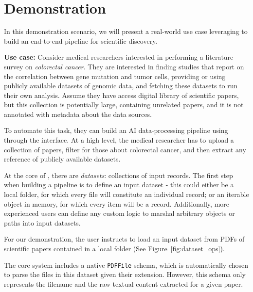 \section{Demonstration}
\label{sec:demoscenario}

In this demonstration scenario, we will present a real-world use case leveraging \chat{} to build an end-to-end pipeline for scientific discovery.

\textbf{Use case:} Consider medical researchers interested in performing a literature survey on \emph{colorectal cancer}. 
They are interested in finding studies that report on the correlation between gene mutation and tumor cells, providing or using publicly available datasets of genomic data, and fetching these datasets to run their own analysis.
Assume they have access digital library of scientific papers, but this collection is potentially large, containing unrelated papers, and it is not annotated with metadata about the data sources.

To automate this task, they can build an AI data-processing pipeline using \sys{} through the \chat{} interface.
At a high level, the medical researcher has to upload a collection of papers, filter for those about colorectal cancer, and then extract any reference of publicly available datasets.

At the core of \sys{}, there are \emph{datasets}: collections of input records.
The first step when building a pipeline is to define an input dataset - this could either be a local folder, for which every file will constitute an individual record; or an iterable object in memory, for which every item will be a record.
Additionally, more experienced users can define any custom logic to marshal arbitrary objects or paths into input datasets.


For our demonstration, the user instructs \chat{} to load an input dataset from PDFs of scientific papers contained in a local folder (See Figure~\ref{fig:dataset_ops}).

The core \chat{} system includes a native \texttt{PDFFile} schema, which is automatically chosen to parse the files in this dataset given their extension. 
However, this schema only represents the filename and the raw textual content extracted for a given paper.

